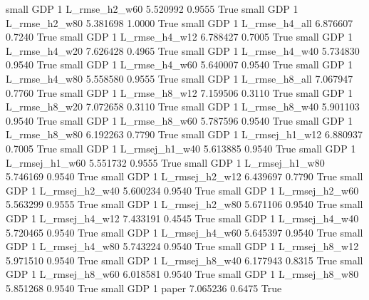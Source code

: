      small      GDP                 1  L_rmse_h2_w60   5.520992      0.9555    True
     small      GDP                 1  L_rmse_h2_w80   5.381698      1.0000    True
     small      GDP                 1  L_rmse_h4_all   6.876607      0.7240    True
     small      GDP                 1  L_rmse_h4_w12   6.788427      0.7005    True
     small      GDP                 1  L_rmse_h4_w20   7.626428      0.4965    True
     small      GDP                 1  L_rmse_h4_w40   5.734830      0.9540    True
     small      GDP                 1  L_rmse_h4_w60   5.640007      0.9540    True
     small      GDP                 1  L_rmse_h4_w80   5.558580      0.9555    True
     small      GDP                 1  L_rmse_h8_all   7.067947      0.7760    True
     small      GDP                 1  L_rmse_h8_w12   7.159506      0.3110    True
     small      GDP                 1  L_rmse_h8_w20   7.072658      0.3110    True
     small      GDP                 1  L_rmse_h8_w40   5.901103      0.9540    True
     small      GDP                 1  L_rmse_h8_w60   5.787596      0.9540    True
     small      GDP                 1  L_rmse_h8_w80   6.192263      0.7790    True
     small      GDP                 1 L_rmsej_h1_w12   6.880937      0.7005    True
     small      GDP                 1 L_rmsej_h1_w40   5.613885      0.9540    True
     small      GDP                 1 L_rmsej_h1_w60   5.551732      0.9555    True
     small      GDP                 1 L_rmsej_h1_w80   5.746169      0.9540    True
     small      GDP                 1 L_rmsej_h2_w12   6.439697      0.7790    True
     small      GDP                 1 L_rmsej_h2_w40   5.600234      0.9540    True
     small      GDP                 1 L_rmsej_h2_w60   5.563299      0.9555    True
     small      GDP                 1 L_rmsej_h2_w80   5.671106      0.9540    True
     small      GDP                 1 L_rmsej_h4_w12   7.433191      0.4545    True
     small      GDP                 1 L_rmsej_h4_w40   5.720465      0.9540    True
     small      GDP                 1 L_rmsej_h4_w60   5.645397      0.9540    True
     small      GDP                 1 L_rmsej_h4_w80   5.743224      0.9540    True
     small      GDP                 1 L_rmsej_h8_w12   5.971510      0.9540    True
     small      GDP                 1 L_rmsej_h8_w40   6.177943      0.8315    True
     small      GDP                 1 L_rmsej_h8_w60   6.018581      0.9540    True
     small      GDP                 1 L_rmsej_h8_w80   5.851268      0.9540    True
     small      GDP                 1          paper   7.065236      0.6475    True
